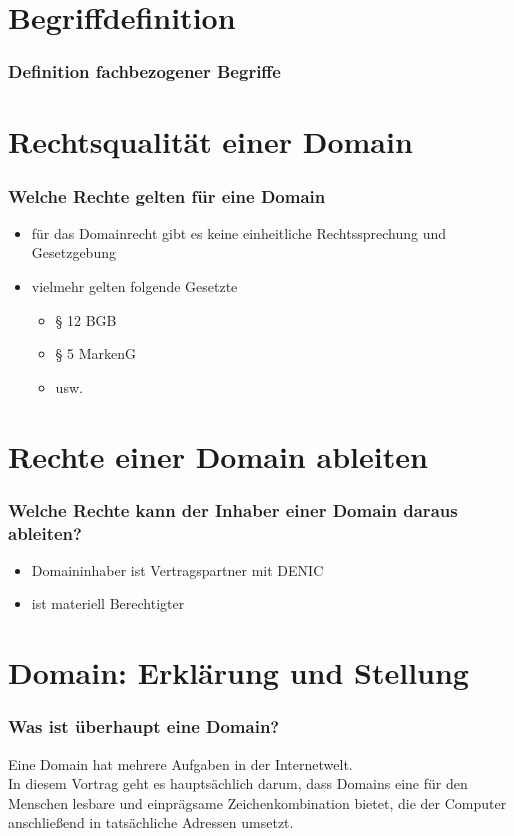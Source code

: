 \documentclass{beamer}
\begin{document}
	\section{Begriffdefinition}
	
	\begin{frame}
		\frametitle{Definition fachbezogener Begriffe}
	\end{frame}
	
	\section{Rechtsqualität einer Domain}
	
	\begin{frame}
		\frametitle{Welche Rechte gelten für eine Domain}
		\begin{itemize}
			\item für das Domainrecht gibt es keine einheitliche Rechtssprechung und Gesetzgebung
			\item vielmehr gelten folgende Gesetzte
			\begin{itemize}
				\item § 12 BGB
				\item § 5 MarkenG
				\item usw.
			\end{itemize}
		\end{itemize}
	\end{frame}
	
	\section{Rechte einer Domain ableiten}
	
	\begin{frame}
		\frametitle{Welche Rechte kann der Inhaber einer Domain daraus ableiten?}
		\begin{itemize}
			\item Domaininhaber ist Vertragspartner mit DENIC
			\item ist materiell Berechtigter
		\end{itemize}
	\end{frame}
	
	\section{Domain: Erklärung und Stellung}

	\begin{frame}
		\frametitle{Was ist überhaupt eine Domain?}
		Eine Domain hat mehrere Aufgaben in der Internetwelt.
		\\
		\bigskip
		In diesem Vortrag geht es hauptsächlich darum, dass Domains eine für den Menschen lesbare und einprägsame Zeichenkombination bietet, die der Computer anschließend in tatsächliche Adressen umsetzt.
	\end{frame}
	
\end{document}
